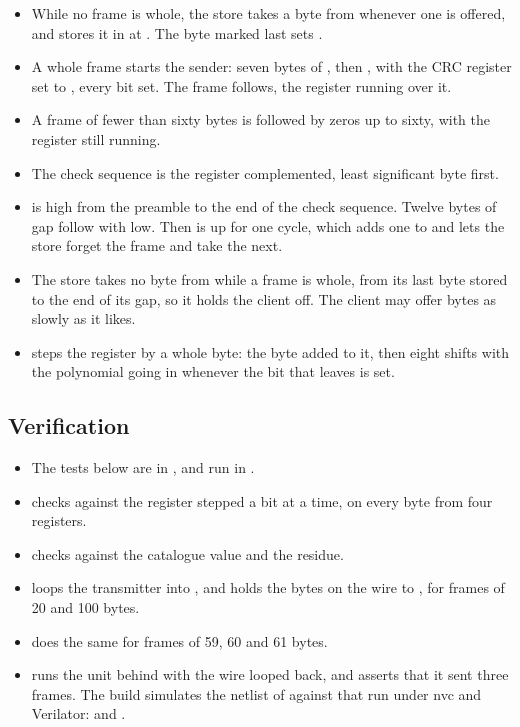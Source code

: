 \begin{itemize}
\item While no frame is whole, the store takes a byte from 
whenever one is offered, and stores it in  at .
The byte marked last sets .
\item A whole frame starts the sender: seven bytes of , then
, with the CRC register set to , every bit
set. The frame follows, the register running over it.
\item A frame of fewer than sixty bytes is followed by zeros up to
sixty, with the register still running.
\item The check sequence is the register complemented, least
significant byte first.
\item {} is high from the preamble to the end of the check
sequence. Twelve bytes of gap follow with  low. Then
 is up for one cycle, which adds one to  and
lets the store forget the frame and take the next.
\item The store takes no byte from  while a frame is whole,
from its last byte stored to the end of its gap, so it holds the client
off. The client may offer bytes as slowly as it likes.
\item {} steps the register by a whole byte: the byte
added to it, then eight shifts with the polynomial 
going in whenever the bit that leaves is set.
\end{itemize}

\subsection*{Verification}

\begin{itemize}
\item The tests below are in , and run in
.
\item {} checks
 against the register stepped a bit at a time, on every
byte from four registers.
\item {} checks  against
the catalogue value and the residue.
\item {}
loops the transmitter into , and holds the bytes on the
wire to , for frames of 20 and 100 bytes.
\item {} does the same for frames
of 59, 60 and 61 bytes.
\item {} runs the unit behind  with the wire
looped back, and asserts that it sent three frames. The build simulates
the netlist of  against that run under nvc and Verilator:
 and
.
\end{itemize}


